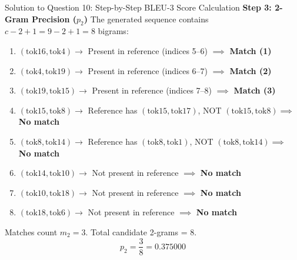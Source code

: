 \documentclass[11pt,a4paper]{article}
\begin{document}
\begin{solutionbox}{Solution to Question 10: Step-by-Step BLEU-3 Score Calculation}
\medskip
\noindent
\textbf{Step 3: 2-Gram Precision ($p_2$)}
The generated sequence contains $c - 2 + 1 = 9 - 2 + 1 = 8$ bigrams:
\begin{enumerate}[leftmargin=1.5em]
    \item $(\text{tok16}, \text{tok4}) \longrightarrow$ Present in reference (indices 5--6) $\implies$ \textcolor{accentgreen}{\textbf{Match (1)}}
    \item $(\text{tok4}, \text{tok19}) \longrightarrow$ Present in reference (indices 6--7) $\implies$ \textcolor{accentgreen}{\textbf{Match (2)}}
    \item $(\text{tok19}, \text{tok15}) \longrightarrow$ Present in reference (indices 7--8) $\implies$ \textcolor{accentgreen}{\textbf{Match (3)}}
    \item $(\text{tok15}, \text{tok8}) \longrightarrow$ Reference has $(\text{tok15}, \text{tok17})$, NOT $(\text{tok15}, \text{tok8}) \implies$ \textcolor{accentred}{\textbf{No match}}
    \item $(\text{tok8}, \text{tok14}) \longrightarrow$ Reference has $(\text{tok8}, \text{tok1})$, NOT $(\text{tok8}, \text{tok14}) \implies$ \textcolor{accentred}{\textbf{No match}}
    \item $(\text{tok14}, \text{tok10}) \longrightarrow$ Not present in reference $\implies$ \textcolor{accentred}{\textbf{No match}}
    \item $(\text{tok10}, \text{tok18}) \longrightarrow$ Not present in reference $\implies$ \textcolor{accentred}{\textbf{No match}}
    \item $(\text{tok18}, \text{tok6}) \longrightarrow$ Not present in reference $\implies$ \textcolor{accentred}{\textbf{No match}}
\end{enumerate}
Matches count $m_2 = 3$. Total candidate 2-grams = 8.
\begin{equation*}
    p_2 = \frac{3}{8} = \mathbf{0.375000}
\end{equation*}


\end{solutionbox}
\end{document}
